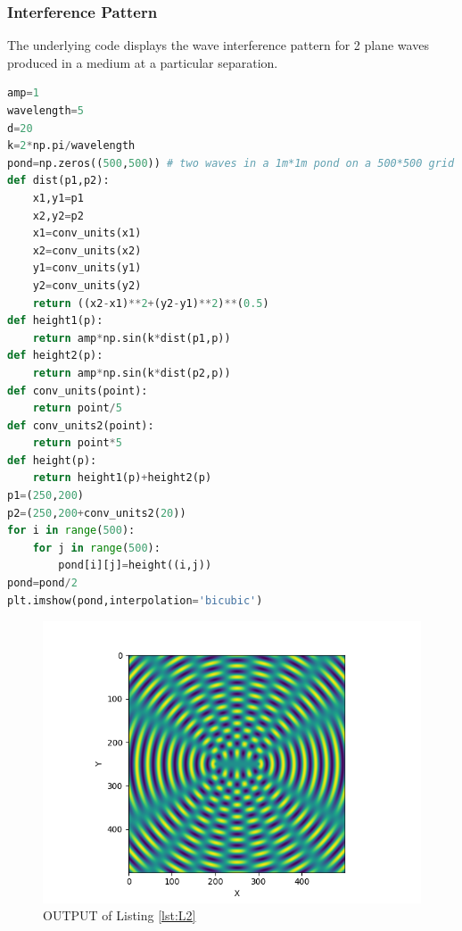 \subsubsection{Interference Pattern}
\par The underlying code displays the wave interference pattern for 2 plane waves produced in a medium at a particular separation.
\begin{lstlisting}[language=Python, caption=Interfernce Pattern, frame=single, label={lst:L2} ]
amp=1
wavelength=5
d=20
k=2*np.pi/wavelength
pond=np.zeros((500,500)) # two waves in a 1m*1m pond on a 500*500 grid
def dist(p1,p2):
	x1,y1=p1
	x2,y2=p2
	x1=conv_units(x1)
	x2=conv_units(x2)
	y1=conv_units(y1)
	y2=conv_units(y2)
	return ((x2-x1)**2+(y2-y1)**2)**(0.5)
def height1(p):
	return amp*np.sin(k*dist(p1,p))
def height2(p):
	return amp*np.sin(k*dist(p2,p))
def conv_units(point):
	return point/5
def conv_units2(point):
	return point*5
def height(p):
	return height1(p)+height2(p)
p1=(250,200)
p2=(250,200+conv_units2(20))
for i in range(500):
	for j in range(500):
		pond[i][j]=height((i,j))
pond=pond/2
plt.imshow(pond,interpolation='bicubic')
\end{lstlisting}
\begin{figure}[H]
	\centering
	\includegraphics[width=0.7\linewidth]{WaveInterference}
	\caption{OUTPUT of Listing \ref{lst:L2}}
	\label{fig:waveinterference}
\end{figure}